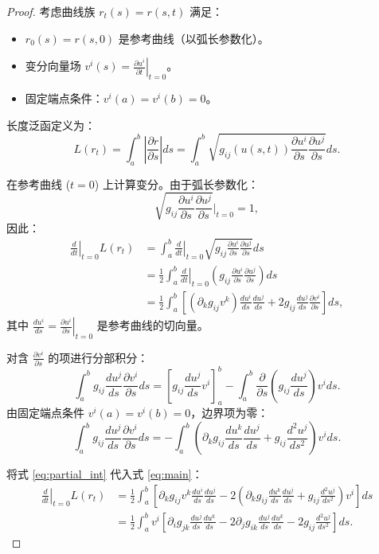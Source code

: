 \documentclass[lang=cn,10pt,thmcnt=section]{elegantbook}
\begin{document}
\begin{proof}
    考虑曲线族 \( r_t(s) = r(s,t) \) 满足：
    \begin{itemize}
      \item \( r_0(s) = r(s,0) \) 是参考曲线（以弧长参数化）。
      \item 变分向量场 \( v^i(s) = \left. \frac{\partial u^i}{\partial t} \right|_{t=0} \)。
      \item 固定端点条件：\( v^i(a) = v^i(b) = 0 \)。
    \end{itemize}
    
    长度泛函定义为：
    \[
    L(r_t) = \int_a^b \left| \frac{\partial r}{\partial s} \right| ds = \int_a^b \sqrt{ g_{ij}(u(s,t)) \frac{\partial u^i}{\partial s} \frac{\partial u^j}{\partial s} }  ds.
    \]
    
    在参考曲线 (\( t=0 \)) 上计算变分。由于弧长参数化：
    \[
    \sqrt{ g_{ij} \frac{\partial u^i}{\partial s} \frac{\partial u^j}{\partial s} } \bigg|_{t=0} = 1,
    \]
    因此：
    \begin{align}
        \left. \frac{d}{dt} \right|_{t=0} L(r_t) 
        &= \int_a^b \left. \frac{d}{dt} \right|_{t=0} \sqrt{ g_{ij} \frac{\partial u^i}{\partial s} \frac{\partial u^j}{\partial s} }  ds \nonumber \\
        &= \frac{1}{2} \int_a^b \left. \frac{d}{dt} \right|_{t=0} \left( g_{ij} \frac{\partial u^i}{\partial s} \frac{\partial u^j}{\partial s} \right) ds \label{eq:main} \\
        &= \frac{1}{2} \int_a^b \left[ \left( \partial_k g_{ij} v^k \right) \frac{du^i}{ds} \frac{du^j}{ds} + 2g_{ij} \frac{du^j}{ds} \frac{\partial v^i}{\partial s} \right] ds, \nonumber
    \end{align}
    其中 \( \frac{du^i}{ds} = \left. \frac{\partial u^i}{\partial s} \right|_{t=0} \) 是参考曲线的切向量。
    
    对含 \( \frac{\partial v^i}{\partial s} \) 的项进行分部积分：
    \[
    \int_a^b g_{ij} \frac{du^j}{ds} \frac{\partial v^i}{\partial s}  ds = \left[ g_{ij} \frac{du^j}{ds} v^i \right]_a^b - \int_a^b \frac{\partial}{\partial s} \left( g_{ij} \frac{du^j}{ds} \right) v^i  ds.
    \]
    由固定端点条件 \( v^i(a) = v^i(b) = 0 \)，边界项为零：
    \[
    \int_a^b g_{ij} \frac{du^j}{ds} \frac{\partial v^i}{\partial s}  ds = - \int_a^b \left( \partial_k g_{ij} \frac{du^k}{ds} \frac{du^j}{ds} + g_{ij} \frac{d^2 u^j}{ds^2} \right) v^i  ds. \label{eq:partial_int}
    \]
    
    将式 \eqref{eq:partial_int} 代入式 \eqref{eq:main}：
    \begin{align}
        \left. \frac{d}{dt} \right|_{t=0} L(r_t) 
        &= \frac{1}{2} \int_a^b \left[ \partial_k g_{ij} v^k \frac{du^i}{ds} \frac{du^j}{ds} - 2 \left( \partial_k g_{ij} \frac{du^k}{ds} \frac{du^j}{ds} + g_{ij} \frac{d^2 u^j}{ds^2} \right) v^i \right] ds \nonumber \\
        &= \frac{1}{2} \int_a^b v^i \left[ \partial_i g_{jk} \frac{du^j}{ds} \frac{du^k}{ds} - 2 \partial_j g_{ik} \frac{du^j}{ds} \frac{du^k}{ds} - 2 g_{ij} \frac{d^2 u^j}{ds^2} \right] ds. \label{eq:combined}
    \end{align}
    

\end{proof}
\end{document}
